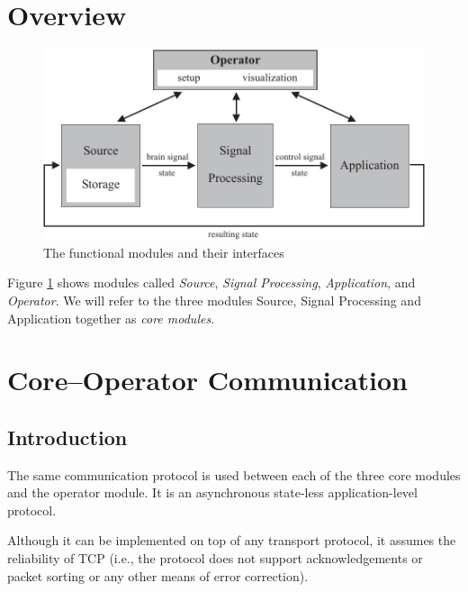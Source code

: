 \documentclass[letterpaper,oneside,12pt]{book}
\newcommand{\todo}[1]{}
\begin{document}
\section{Overview}

\begin{figure}[ht]
 \centerline{\includegraphics{figures/modules}}
 \caption{The functional modules and their interfaces}
 \label{fig:modules}
\end{figure}

Figure \ref{fig:modules} shows modules called \textit{Source}, \textit{Signal 
Processing}, \textit{Application}, and \textit{Operator}. We will refer to the 
three modules Source, Signal Processing and Application together as \textit{core 
modules}.




\section{Core--Operator Communication}

\subsection{Introduction}

The same communication protocol is used between each of the three core modules 
and the operator module. It is an asynchronous state-less application-level 
protocol.
\todo{What exactly does this mean? Is it actually true?}
Although it can be implemented on top of any transport protocol, it 
assumes the reliability of TCP (i.e., the protocol does not support 
acknowledgements or packet sorting or any other means of error correction).
\end{document}

